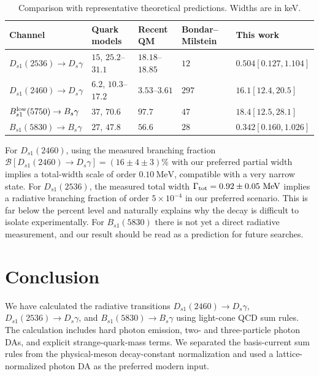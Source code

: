 \documentclass[aps,prd,preprint,nofootinbib,superscriptaddress]{revtex4-2}
\newcommand{\Ds}{D_s}
\newcommand{\Dsone}{D_{s1}}
\newcommand{\Bs}{B_s}
\newcommand{\Bsone}{B_{s1}}
\newcommand{\MeV}{\mathrm{MeV}}
\begin{document}
\begin{table}[t]
\caption{Comparison with representative theoretical predictions.  Widths are
in keV.}
\label{tab:literature}
\begin{ruledtabular}
\begin{tabular}{lllll}
Channel & Quark models & Recent QM & Bondar--Milstein & This work\\
\hline
$\Dsone(2536)\to\Ds\gamma$ & $15$, $25.2$--$31.1$ & $18.18$--$18.85$ & $12$ & $0.504[0.127,1.104]$\\
$\Dsone(2460)\to\Ds\gamma$ & $6.2$, $10.3$--$17.2$ & $3.53$--$3.61$ & $297$ & $16.1[12.4,20.5]$\\
$\Bsone^{\rm low}(5750)\to\Bs\gamma$ & $37$, $70.6$ & $97.7$ & $47$ & $18.4[12.5,28.1]$\\
$\Bsone(5830)\to\Bs\gamma$ & $27$, $47.8$ & $56.6$ & $28$ & $0.342[0.160,1.026]$\\
\end{tabular}
\end{ruledtabular}
\end{table}

For $\Dsone(2460)$, using the measured branching fraction
$\mathcal B[\Dsone(2460)\to\Ds\gamma]=(16\pm4\pm3)\%$ \cite{BaBar:2006eep}
with our preferred partial width implies a total-width scale of order
$0.10~\MeV$, compatible with a very narrow state.  For $\Dsone(2536)$, the
measured total width $\Gamma_{\rm tot}=0.92\pm0.05~\MeV$
\cite{BaBar:2011zpy} implies a radiative branching fraction of order
$5\times10^{-4}$ in our preferred scenario.  This is far below the percent
level and naturally explains why the decay is difficult to isolate
experimentally.  For $\Bsone(5830)$ there is not yet a direct radiative
measurement, and our result should be read as a prediction for future searches.

\section{Conclusion}
\label{sec:concl}

We have calculated the radiative transitions
$\Dsone(2460)\to\Ds\gamma$, $\Dsone(2536)\to\Ds\gamma$, and
$\Bsone(5830)\to\Bs\gamma$ using light-cone QCD sum rules.  The calculation
includes hard photon emission, two- and three-particle photon DAs, and
explicit strange-quark-mass terms.  We separated the basis-current sum rules
from the physical-meson decay-constant normalization and used a
lattice-normalized photon DA as the preferred modern input.
\end{document}
